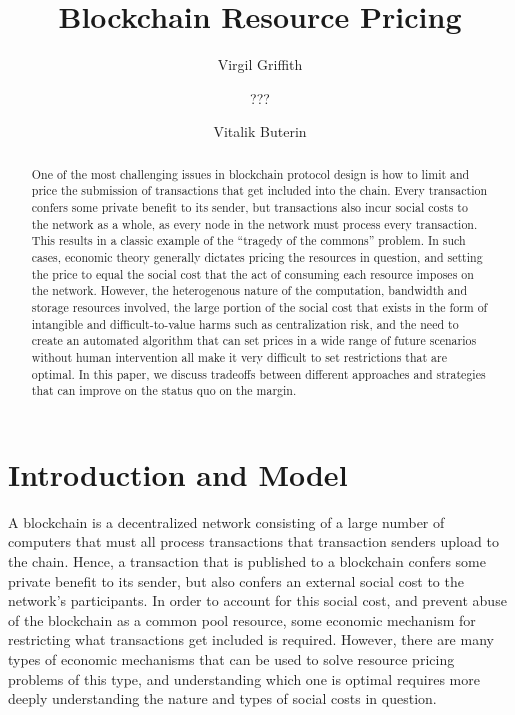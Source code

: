 \documentclass[12pt, final]{article}
\author{Virgil Griffith}
\author{???}
\author{Vitalik Buterin}
\title{Blockchain Resource Pricing}
\begin{document}
\maketitle
\vspace{-0.2in} \TODO{\today}





\begin{abstract}

One of the most challenging issues in blockchain protocol design is how to limit and price the submission of transactions that get included into the chain. Every transaction confers some private benefit to its sender, but transactions also incur social costs to the network as a whole, as every node in the network must process every transaction. This results in a classic example of the ``tragedy of the commons'' problem. In such cases, economic theory generally dictates pricing the resources in question, and setting the price to equal the social cost that the act of consuming each resource imposes on the network. However, the heterogenous nature of the computation, bandwidth and storage resources involved, the large portion of the social cost that exists in the form of intangible and difficult-to-value harms such as centralization risk, and the need to create an automated algorithm that can set prices in a wide range of future scenarios without human intervention all make it very difficult to set restrictions that are optimal. In this paper, we discuss tradeoffs between different approaches and strategies that can improve on the status quo on the margin.
\end{abstract}

\section{Introduction and Model}

A blockchain is a decentralized network consisting of a large number of computers that must all process transactions that transaction senders upload to the chain. Hence, a transaction that is published to a blockchain confers some private benefit to its sender, but also confers an external social cost to the network's participants. In order to account for this social cost, and prevent abuse of the blockchain as a common pool resource, some economic mechanism for restricting what transactions get included is required. However, there are many types of economic mechanisms that can be used to solve resource pricing problems of this type, and understanding which one is optimal requires more deeply understanding the nature and types of social costs in question.
\end{document}
